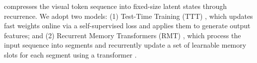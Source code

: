  compresses the visual token sequence into fixed-size latent states through recurrence. We adopt two models: (1) Test-Time Training (TTT) \cite{sun2024learning, zhang2025test}, which updates fast weights online via a self-supervised loss and applies them to generate output features; and (2) Recurrent Memory Transformers (RMT) \cite{bulatov2022recurrent, bulatov2023scaling}, which process the input sequence into segments and recurrently update a set of learnable memory slots for each segment using a transformer \cite{vaswani2017attention}.






